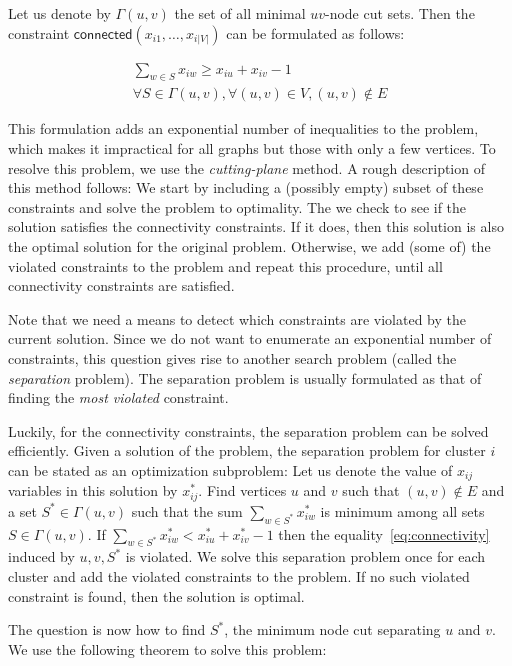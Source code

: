 \documentclass[conference,compsoc]{IEEEtran}
\begin{document}
Let us denote by $\Gamma(u, v)$ the set of all minimal $uv$-node cut sets. Then the constraint $\mathsf{connected}(x_{i1}, \ldots, x_{i|V|})$ can be formulated as follows:

\begin{multline}
\sum_{w \in S} x_{iw} \geq x_{iu} + x_{iv} - 1 \\
\forall S \in \Gamma(u, v), \forall (u, v) \in V, (u, v) \notin E
\label{eq:connectivity}
\end{multline}

This formulation adds an exponential number of inequalities to the
problem, which makes it impractical for all graphs but those with only a
few vertices. To resolve this problem, we use the \emph{cutting-plane}
method. A rough description of this method follows: We start by
including a (possibly empty) subset of these constraints and solve the
problem to optimality. The we check to see if the solution satisfies the
connectivity constraints. If it does, then this solution is also the
optimal solution for the original problem. Otherwise, we add (some of)
the violated constraints to the problem and repeat this procedure, until
all connectivity constraints are satisfied.

Note that we need a means to detect which constraints are violated by
the current solution. Since we do not want to enumerate an exponential
number of constraints, this question gives rise to another search
problem (called the \emph{separation} problem). The separation problem
is usually formulated as that of finding the \emph{most violated}
constraint.

Luckily, for the connectivity constraints, the separation problem can be
solved efficiently. Given a solution of the problem, the
separation problem for cluster $i$ can be stated as an optimization subproblem: Let us denote the value of $x_{ij}$ variables in this solution by $x^*_{ij}$. Find vertices $u$ and $v$ such that $(u, v) \notin E$ and a set $S^* \in \Gamma(u, v)$ such that the sum $\sum_{w \in S^*} x_{iw}^*$ is
minimum among all sets $S \in \Gamma(u, v)$. If $\sum_{w \in S^*} x_{iw}^* < x^*_{iu} + x^*_{iv} - 1$ then the equality~\ref{eq:connectivity}
induced by $u, v, S^*$ is violated. We solve this separation problem
once for each cluster and add the violated constraints to the problem.
If no such violated constraint is found, then the solution is optimal.

The question is now how to find $S^*$, the minimum node cut separating
$u$ and $v$. We use the following theorem to solve this problem:
\end{document}
